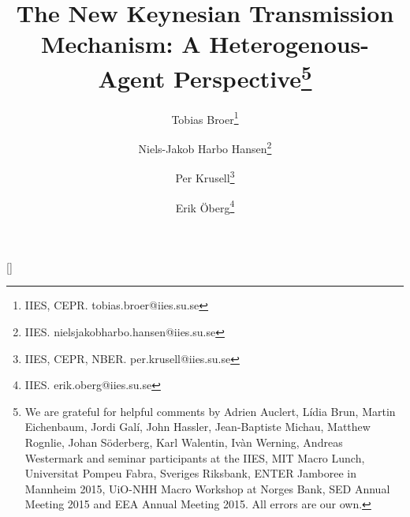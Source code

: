 \documentclass{article}[11pt]
\title{The New Keynesian Transmission Mechanism: A Heterogenous- Agent Perspective\footnote{We are grateful for helpful comments by Adrien Auclert, L\'idia  Brun, Martin Eichenbaum, Jordi Gal\'i, John Hassler, Jean-Baptiste Michau, Matthew Rognlie, Johan S\"{o}derberg, Karl Walentin, Iv\`{a}n Werning, Andreas Westermark and seminar participants at the IIES, MIT Macro Lunch, Universitat Pompeu Fabra, Sveriges Riksbank, ENTER Jamboree in Mannheim 2015, UiO-NHH Macro Workshop at Norges Bank, SED Annual Meeting 2015 and EEA Annual Meeting 2015. All errors are our own.}}
\author{
  Tobias Broer\footnote{IIES, CEPR. tobias.broer@iies.su.se}\\
  \and
  Niels-Jakob Harbo Hansen\footnote{IIES. nielsjakobharbo.hansen@iies.su.se}\\
  \and
  Per Krusell\footnote{IIES, CEPR, NBER. per.krusell@iies.su.se}\\
  \and
  Erik \"{O}berg\footnote{IIES. erik.oberg@iies.su.se}\\
}
\date{\parbox{\linewidth}{\centering%
  April 29, 2015\endgraf\bigskip
  {\Large \textbf{Preliminary and incomplete - please do not quote!}}\endgraf}}
\begin{document}
\maketitle 





[] 

\newpage

\newpage

\newpage

\newpage

\newpage

\newpage

\newpage

\newpage


\clearpage

\end{document}

